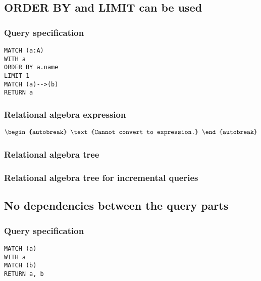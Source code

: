 
\subsection{ORDER BY and LIMIT can be used}

\subsubsection*{Query specification}

\begin{lstlisting}
MATCH (a:A)
WITH a
ORDER BY a.name
LIMIT 1
MATCH (a)-->(b)
RETURN a
\end{lstlisting}

\subsubsection*{Relational algebra expression}

\begin{align*}
\begin{autobreak}
\text{Cannot convert to expression.}
\end{autobreak}
\end{align*}

\subsubsection*{Relational algebra tree}


\subsubsection*{Relational algebra tree for incremental queries}


\subsection{No dependencies between the query parts}

\subsubsection*{Query specification}

\begin{lstlisting}
MATCH (a)
WITH a
MATCH (b)
RETURN a, b
\end{lstlisting}

